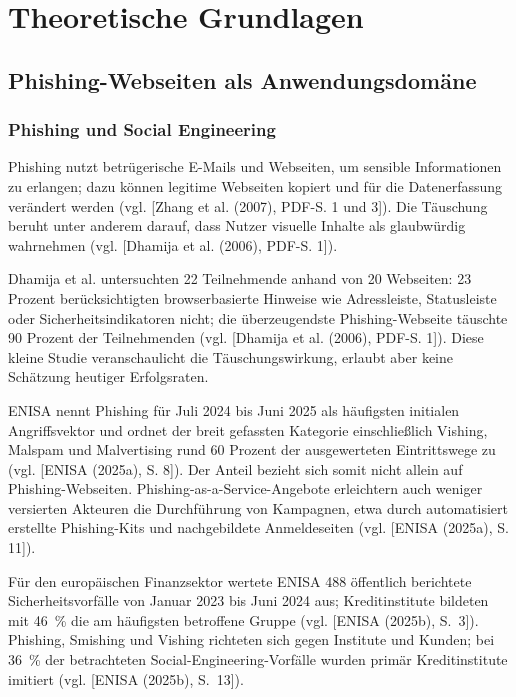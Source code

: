 \chapter{Theoretische Grundlagen}

\section{Phishing-Webseiten als Anwendungsdomäne}
\subsection{Phishing und Social Engineering}

Phishing nutzt betrügerische E-Mails und Webseiten, um sensible Informationen zu erlangen; dazu können legitime Webseiten kopiert und für die Datenerfassung verändert werden (vgl. [Zhang et al. (2007), PDF-S. 1 und 3]). Die Täuschung beruht unter anderem darauf, dass Nutzer visuelle Inhalte als glaubwürdig wahrnehmen (vgl. [Dhamija et al. (2006), PDF-S. 1]).

Dhamija et al. untersuchten 22 Teilnehmende anhand von 20 Webseiten: 23 Prozent berücksichtigten browserbasierte Hinweise wie Adressleiste, Statusleiste oder Sicherheitsindikatoren nicht; die überzeugendste Phishing-Webseite täuschte 90 Prozent der Teilnehmenden (vgl. [Dhamija et al. (2006), PDF-S. 1]). Diese kleine Studie veranschaulicht die Täuschungswirkung, erlaubt aber keine Schätzung heutiger Erfolgsraten.

ENISA nennt Phishing für Juli 2024 bis Juni 2025 als häufigsten initialen Angriffsvektor und ordnet der breit gefassten Kategorie einschließlich Vishing, Malspam und Malvertising rund 60 Prozent der ausgewerteten Eintrittswege zu (vgl. [ENISA (2025a), S. 8]). Der Anteil bezieht sich somit nicht allein auf Phishing-Webseiten. Phishing-as-a-Service-Angebote erleichtern auch weniger versierten Akteuren die Durchführung von Kampagnen, etwa durch automatisiert erstellte Phishing-Kits und nachgebildete Anmeldeseiten (vgl. [ENISA (2025a), S. 11]).

Für den europäischen Finanzsektor wertete ENISA 488 öffentlich berichtete Sicherheitsvorfälle von Januar 2023 bis Juni 2024 aus; Kreditinstitute bildeten mit 46~\% die am häufigsten betroffene Gruppe (vgl. [ENISA (2025b), S.~3]). Phishing, Smishing und Vishing richteten sich gegen Institute und Kunden; bei 36~\% der betrachteten Social-Engineering-Vorfälle wurden primär Kreditinstitute imitiert (vgl. [ENISA (2025b), S.~13]).

